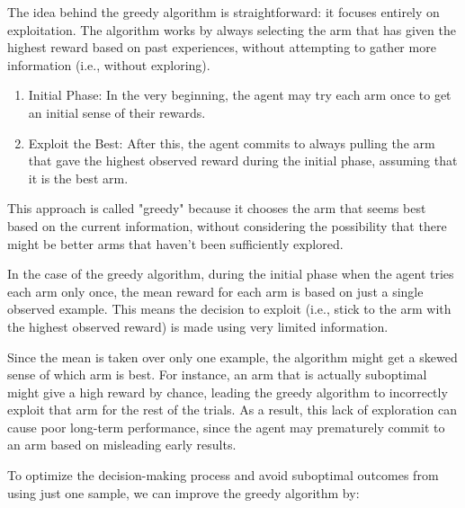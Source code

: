 The idea behind the greedy algorithm is straightforward: it focuses entirely on exploitation. The algorithm works by always selecting the arm that has given the highest reward based on past experiences, without attempting to gather more information (i.e., without exploring).

\begin{enumerate}
    \item Initial Phase: In the very beginning, the agent may try each arm once to get an initial sense of their rewards.
    \item Exploit the Best: After this, the agent commits to always pulling the arm that gave the highest observed reward during the initial phase, assuming that it is the best arm.
\end{enumerate}

This approach is called "greedy" because it chooses the arm that seems best based on the current information, without considering the possibility that there might be better arms that haven’t been sufficiently explored.

\begin{warningbox}[Warning]
    In the case of the greedy algorithm, during the initial phase when the agent tries each arm only once, the mean reward for each arm is based on just a single observed example. This means the decision to exploit (i.e., stick to the arm with the highest observed reward) is made using very limited information.

    Since the mean is taken over only one example, the algorithm might get a skewed sense of which arm is best. For instance, an arm that is actually suboptimal might give a high reward by chance, leading the greedy algorithm to incorrectly exploit that arm for the rest of the trials. As a result, this lack of exploration can cause poor long-term performance, since the agent may prematurely commit to an arm based on misleading early results.
\end{warningbox}

To optimize the decision-making process and avoid suboptimal outcomes from using just one sample, we can improve the greedy algorithm by:

